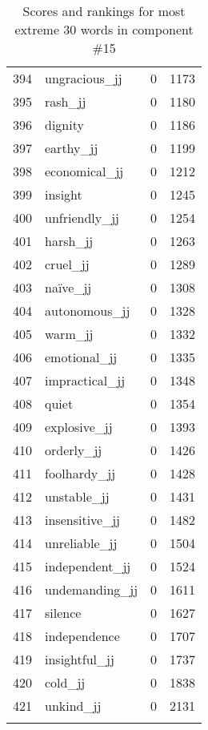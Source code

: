 \begin{longtable}[!htbp]{| rlr@{.}l |}
    394 & ungracious\_jj & 0 & 1173 \\
    395 & rash\_jj & 0 & 1180 \\
    396 & dignity & 0 & 1186 \\
    397 & earthy\_jj & 0 & 1199 \\
    398 & economical\_jj & 0 & 1212 \\
    399 & insight & 0 & 1245 \\
    400 & unfriendly\_jj & 0 & 1254 \\
    401 & harsh\_jj & 0 & 1263 \\
    402 & cruel\_jj & 0 & 1289 \\
    403 & naïve\_jj & 0 & 1308 \\
    404 & autonomous\_jj & 0 & 1328 \\
    405 & warm\_jj & 0 & 1332 \\
    406 & emotional\_jj & 0 & 1335 \\
    407 & impractical\_jj & 0 & 1348 \\
    408 & quiet & 0 & 1354 \\
    409 & explosive\_jj & 0 & 1393 \\
    410 & orderly\_jj & 0 & 1426 \\
    411 & foolhardy\_jj & 0 & 1428 \\
    412 & unstable\_jj & 0 & 1431 \\
    413 & insensitive\_jj & 0 & 1482 \\
    414 & unreliable\_jj & 0 & 1504 \\
    415 & independent\_jj & 0 & 1524 \\
    416 & undemanding\_jj & 0 & 1611 \\
    417 & silence & 0 & 1627 \\
    418 & independence & 0 & 1707 \\
    419 & insightful\_jj & 0 & 1737 \\
    420 & cold\_jj & 0 & 1838 \\
    421 & unkind\_jj & 0 & 2131 \\
    \hline
    \caption{Scores and rankings for most extreme 30 words in component \#15} \\
\end{longtable}
